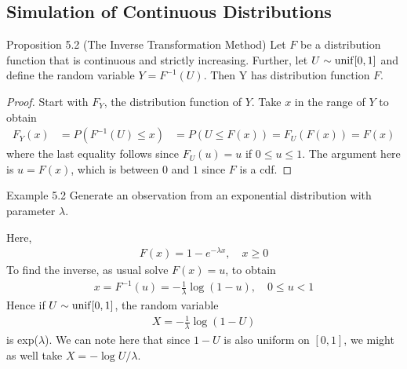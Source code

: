 \subsection{Simulation of Continuous Distributions}
\begin{boks}{Proposition 5.2 (The Inverse Transformation Method)}
  Let $F$ be a distribution function that is continuous and strictly increasing. Further, let $U \sim \operatorname{unif}[0,1]$ and define the random variable $Y = F^{-1}(U)$. Then Y has distribution function $F$.
\end{boks}
\begin{proof}
  Start with $F_Y$, the distribution function of $Y$. Take $x$ in the range of $Y$ to obtain
  \begin{align*}
    F_Y(x) &= P(F^{-1}(U) \leq x)
    &= P(U \leq F(x)) = F_U(F(x)) = F(x)
  \end{align*}
  where the last equality follows since $F_U(u) = u$ if $0 \leq u \leq 1$. The argument here is $u = F(x)$, which is between $0$ and $1$ since $F$ is a cdf.
\end{proof}

\begin{boks}{Example 5.2}
  Generate an observation from an exponential distribution with parameter $\lambda$.

  Here,
  \begin{align*}
    F(x) = 1- e^{-\lambda x}, \quad x \geq 0
  \end{align*}
  To find the inverse, as usual solve $F(x) = u$, to obtain
  \begin{align*}
    x = F^{-1}(u) = -\frac{1}{\lambda} \log(1 - u), \quad 0 \leq u < 1
  \end{align*}
  Hence if $U \sim \operatorname{unif}[0,1]$, the random variable
  \begin{align*}
  X = -\frac{1}{\lambda} \log(1 - U)
  \end{align*}
  is exp($\lambda$). We can note here that since $1 - U$ is also uniform on $[0,1]$, we might as well take $X = - \log U/\lambda$.
\end{boks}


